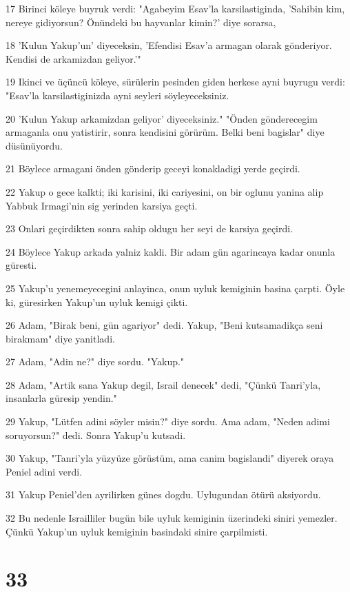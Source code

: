 \par 17 Birinci köleye buyruk verdi: "Agabeyim Esav'la karsilastiginda, 'Sahibin kim, nereye gidiyorsun? Önündeki bu hayvanlar kimin?' diye sorarsa,
\par 18 'Kulun Yakup'un' diyeceksin, 'Efendisi Esav'a armagan olarak gönderiyor. Kendisi de arkamizdan geliyor.'"
\par 19 Ikinci ve üçüncü köleye, sürülerin pesinden giden herkese ayni buyrugu verdi: "Esav'la karsilastiginizda ayni seyleri söyleyeceksiniz.
\par 20 'Kulun Yakup arkamizdan geliyor' diyeceksiniz." "Önden gönderecegim armaganla onu yatistirir, sonra kendisini görürüm. Belki beni bagislar" diye düsünüyordu.
\par 21 Böylece armagani önden gönderip geceyi konakladigi yerde geçirdi.
\par 22 Yakup o gece kalkti; iki karisini, iki cariyesini, on bir oglunu yanina alip Yabbuk Irmagi'nin sig yerinden karsiya geçti.
\par 23 Onlari geçirdikten sonra sahip oldugu her seyi de karsiya geçirdi.
\par 24 Böylece Yakup arkada yalniz kaldi. Bir adam gün agarincaya kadar onunla güresti.
\par 25 Yakup'u yenemeyecegini anlayinca, onun uyluk kemiginin basina çarpti. Öyle ki, güresirken Yakup'un uyluk kemigi çikti.
\par 26 Adam, "Birak beni, gün agariyor" dedi. Yakup, "Beni kutsamadikça seni birakmam" diye yanitladi.
\par 27 Adam, "Adin ne?" diye sordu. "Yakup."
\par 28 Adam, "Artik sana Yakup degil, Israil denecek" dedi, "Çünkü Tanri'yla, insanlarla güresip yendin."
\par 29 Yakup, "Lütfen adini söyler misin?" diye sordu. Ama adam, "Neden adimi soruyorsun?" dedi. Sonra Yakup'u kutsadi.
\par 30 Yakup, "Tanri'yla yüzyüze görüstüm, ama canim bagislandi" diyerek oraya Peniel adini verdi.
\par 31 Yakup Peniel'den ayrilirken günes dogdu. Uylugundan ötürü aksiyordu.
\par 32 Bu nedenle Israilliler bugün bile uyluk kemiginin üzerindeki siniri yemezler. Çünkü Yakup'un uyluk kemiginin basindaki sinire çarpilmisti.

\chapter{33}


